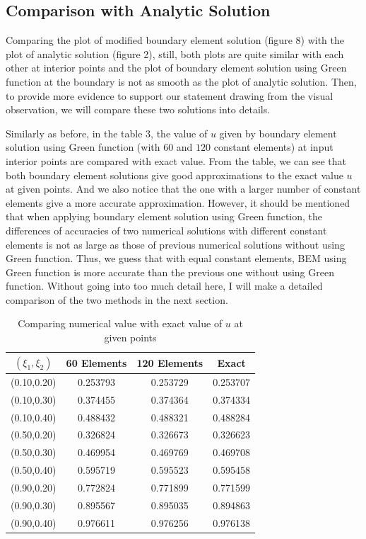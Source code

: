\documentclass[a4paper,12pt]{article}
\begin{document}
\subsection{Comparison with Analytic Solution}
Comparing the plot of modified boundary element solution (figure 8) with the plot of analytic solution (figure 2), still, both plots are quite similar with each other at interior points and the plot of boundary element solution using Green function at the boundary is not as smooth as the plot of analytic solution. Then, to provide more evidence to support our statement drawing from the visual observation, we will compare these two solutions into details.  

Similarly as before, in the table 3, the value of $u$ given by boundary element solution using Green function (with $60$ and $120$ constant elements) at input interior points are compared with exact value. From the table, we can see that both boundary element solutions give good approximations to the exact value $u$ at given points. And we also notice that the one with a larger number of constant elements give a more accurate approximation. However, it should be mentioned that when applying boundary element solution using Green function, the differences of accuracies of two numerical solutions with different constant elements is not as large as those of previous numerical solutions without using Green function. Thus, we guess that with equal constant elements, BEM using Green function is more accurate than the previous one without using Green function. Without going into too much detail here, I will make a detailed comparison of the two methods in the next section.
\begin{table}[H]
\centering
\begin{tabular}{@{}cccc@{}}
\toprule
   $(\xi_1,\xi_2)$         & 60 Elements & 120 Elements & Exact    \\ \midrule
(0.10,0.20) & 0.253793    & 0.253729     & 0.253707 \\
(0.10,0.30) & 0.374455     & 0.374364      & 0.374334 \\
(0.10,0.40) & 0.488432     & 0.488321      & 0.488284 \\
(0.50,0.20) & 0.326824     & 0.326673      & 0.326623 \\
(0.50,0.30) & 0.469954     & 0.469769      & 0.469708 \\
(0.50,0.40) & 0.595719     & 0.595523      & 0.595458 \\
(0.90,0.20) & 0.772824     & 0.771899      & 0.771599 \\
(0.90,0.30) & 0.895567     & 0.895035      & 0.894863 \\
(0.90,0.40) & 0.976611     & 0.976256      & 0.976138 \\ \bottomrule
\end{tabular}
\caption{Comparing numerical value with exact value of $u$ at given points}
\label{tab:my-table}
\end{table}
\end{document}
